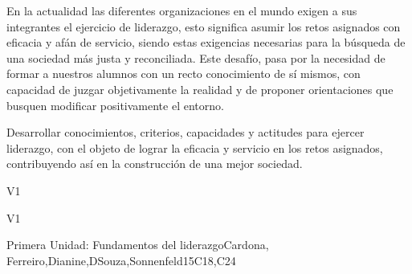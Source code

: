 \begin{syllabus}


\begin{justification}
En la actualidad las diferentes organizaciones en el mundo exigen a sus integrantes el ejercicio de liderazgo, esto significa asumir los retos asignados con eficacia y afán de servicio, siendo estas exigencias necesarias para la búsqueda de una sociedad más justa y reconciliada. 
Este desafío, pasa por la necesidad de formar a nuestros alumnos con un recto conocimiento de sí mismos, con capacidad de juzgar objetivamente la realidad y de proponer  orientaciones que busquen modificar positivamente el entorno.  \end{justification}

\begin{goals}
\item Desarrollar conocimientos, criterios, capacidades y actitudes para ejercer liderazgo, con el objeto de lograr la eficacia y servicio en los retos asignados, contribuyendo así en la construcción de una mejor sociedad.
\end{goals}

\begin{outcomes}{V1}
    \item {}
    \item {}
    \item {}
\end{outcomes}

\begin{competences}{V1}
    \item {}
    \item {}
    \item {}
\end{competences}

\begin{unit}{}{Primera Unidad: Fundamentos del liderazgo}{Cardona, Ferreiro,Dianine,DSouza,Sonnenfeld}{15}{C18,C24}
\begin{topics}
	

\end{topics}
\end{unit}
\end{syllabus}
